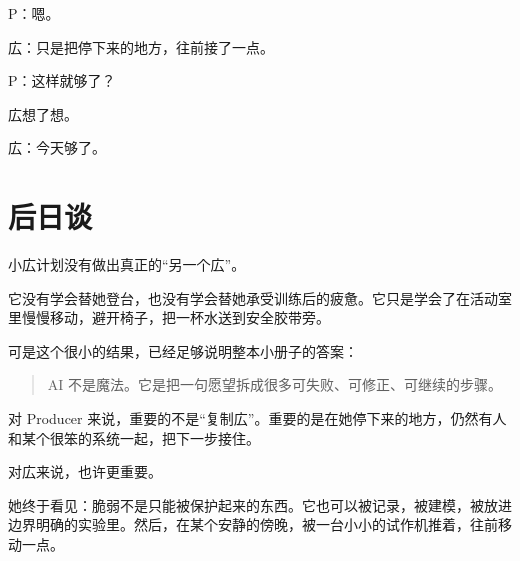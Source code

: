 P：嗯。

広：只是把停下来的地方，往前接了一点。

P：这样就够了？

広想了想。

広：今天够了。

\clearpage

\section{后日谈}

小広计划没有做出真正的“另一个広”。

它没有学会替她登台，也没有学会替她承受训练后的疲惫。它只是学会了在活动室里慢慢移动，避开椅子，把一杯水送到安全胶带旁。

可是这个很小的结果，已经足够说明整本小册子的答案：

\begin{quote}
AI 不是魔法。它是把一句愿望拆成很多可失败、可修正、可继续的步骤。
\end{quote}

对 Producer 来说，重要的不是“复制広”。重要的是在她停下来的地方，仍然有人和某个很笨的系统一起，把下一步接住。

对広来说，也许更重要。

她终于看见：脆弱不是只能被保护起来的东西。它也可以被记录，被建模，被放进边界明确的实验里。然后，在某个安静的傍晚，被一台小小的试作机推着，往前移动一点。
